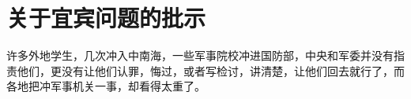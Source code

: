 \section[关于宜宾问题的批示（一九六七年四月）]{关于宜宾问题的批示}


许多外地学生，几次冲入中南海，一些军事院校冲进国防部，中央和军委并没有指责他们，更没有让他们认罪，悔过，或者写检讨，讲清楚，让他们回去就行了，而各地把冲军事机关一事，却看得太重了。

